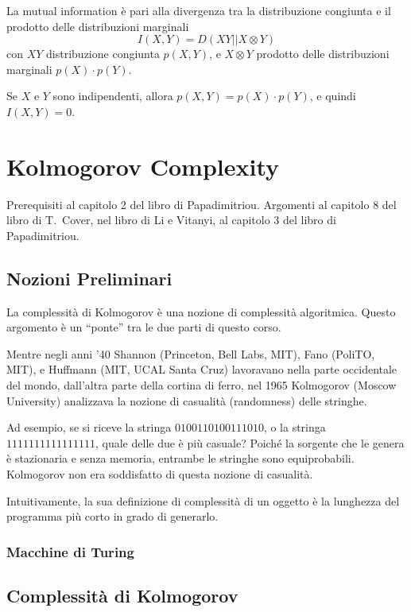 \begin{theorem}
    La mutual information è pari alla divergenza tra la distribuzione congiunta e il prodotto delle distribuzioni marginali
    $$
        I(X,Y) = D(XY||X\otimes Y)
    $$
    con $XY$ distribuzione congiunta $p(X,Y)$, e $X\otimes Y$ prodotto delle distribuzioni marginali $p(X)\cdot p(Y)$.
\end{theorem}
Se $X$ e $Y$ sono indipendenti, allora $p(X,Y) = p(X)\cdot p(Y)$, e quindi $I(X,Y)=0$.




\chapter{Kolmogorov Complexity}
Prerequisiti al capitolo 2 del libro di Papadimitriou. Argomenti al capitolo 8 del libro di T.~Cover, nel libro di Li e Vitanyi, al capitolo 3 del libro di Papadimitriou.

\section{Nozioni Preliminari}
La complessità di Kolmogorov è una nozione di complessità algoritmica. Questo argomento è un ``ponte'' tra le due parti di questo corso.

Mentre negli anni '40 Shannon (Princeton, Bell Labs, MIT), Fano (PoliTO, MIT), e Huffmann (MIT, UCAL Santa Cruz) lavoravano nella parte occidentale del mondo, dall'altra parte della cortina di ferro, nel 1965 Kolmogorov (Moscow University) analizzava la nozione di casualità (randomness) delle stringhe.

Ad esempio, se si riceve la stringa $0100110100111010$, o la stringa $1111111111111111$, quale delle due è più casuale? Poiché la sorgente che le genera è stazionaria e senza memoria, entrambe le stringhe sono equiprobabili. Kolmogorov non era soddisfatto di questa nozione di casualità.

Intuitivamente, la sua definizione di complessità di un oggetto è la lunghezza del programma più corto in grado di generarlo.


\subsection{Macchine di Turing}



\section{Complessità di Kolmogorov}


